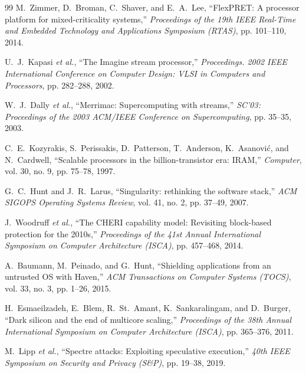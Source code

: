 \documentclass[twocolumn]{article}
\begin{document}
\begin{thebibliography}{99}
M.~Zimmer, D.~Broman, C.~Shaver, and E.~A.~Lee,
``FlexPRET: A processor platform for mixed-criticality systems,''
\emph{Proceedings of the 19th IEEE Real-Time and Embedded Technology and Applications Symposium (RTAS)}, pp. 101--110, 2014.

U.~J.~Kapasi \emph{et al.},
``The Imagine stream processor,''
\emph{Proceedings. 2002 IEEE International Conference on Computer Design: VLSI in Computers and Processors}, pp. 282--288, 2002.

W.~J.~Dally \emph{et al.},
``Merrimac: Supercomputing with streams,''
\emph{SC'03: Proceedings of the 2003 ACM/IEEE Conference on Supercomputing}, pp. 35--35, 2003.

C.~E.~Kozyrakis, S.~Perissakis, D.~Patterson, T.~Anderson, K.~Asanovi\'{c}, and N.~Cardwell,
``Scalable processors in the billion-transistor era: IRAM,''
\emph{Computer}, vol. 30, no. 9, pp. 75--78, 1997.

G.~C.~Hunt and J.~R.~Larus,
``Singularity: rethinking the software stack,''
\emph{ACM SIGOPS Operating Systems Review}, vol. 41, no. 2, pp. 37--49, 2007.

J.~Woodruff \emph{et al.},
``The CHERI capability model: Revisiting block-based protection for the 2010s,''
\emph{Proceedings of the 41st Annual International Symposium on Computer Architecture (ISCA)}, pp. 457--468, 2014.

A.~Baumann, M.~Peinado, and G.~Hunt,
``Shielding applications from an untrusted OS with Haven,''
\emph{ACM Transactions on Computer Systems (TOCS)}, vol. 33, no. 3, pp. 1--26, 2015.






H.~Esmaeilzadeh, E.~Blem, R.~St.~Amant, K.~Sankaralingam, and D.~Burger,
``Dark silicon and the end of multicore scaling,''
\emph{Proceedings of the 38th Annual International Symposium on Computer Architecture (ISCA)}, pp. 365--376, 2011.

M.~Lipp \emph{et al.},
``Spectre attacks: Exploiting speculative execution,''
\emph{40th IEEE Symposium on Security and Privacy (S\&P)}, pp. 19--38, 2019.


\end{thebibliography}
\end{document}
